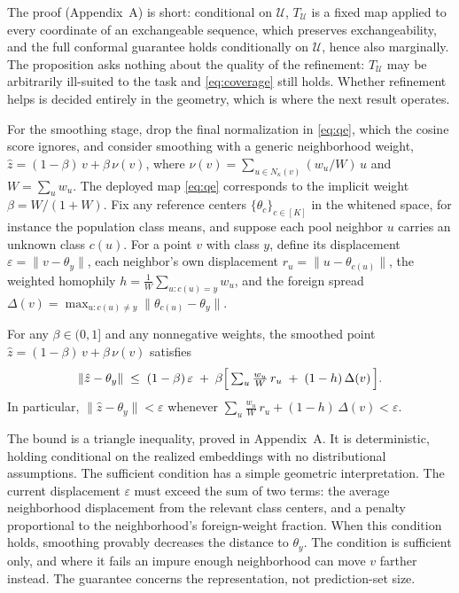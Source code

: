 The proof (Appendix~A) is short: conditional on $\mathcal{U}$,
$T_{\mathcal{U}}$ is a fixed map applied to every coordinate of an
exchangeable sequence, which preserves exchangeability, and the full
conformal guarantee holds conditionally on $\mathcal{U}$, hence also
marginally. The proposition asks nothing about the quality of the
refinement: $T_{\mathcal{U}}$ may be arbitrarily ill-suited to the
task and \eqref{eq:coverage} still holds. Whether refinement helps is
decided entirely in the geometry, which is where the next result
operates.

For the smoothing stage, drop the final normalization in
\eqref{eq:qe}, which the cosine score ignores, and consider smoothing
with a generic neighborhood weight,
$\hat z = (1-\beta)\, v + \beta\, \nu(v)$, where
$\nu(v) = \sum_{u \in N_{\kappa}(v)} (w_u / W)\, u$ and
$W = \sum_{u} w_u$. The deployed map \eqref{eq:qe} corresponds to the
implicit weight $\beta = W/(1+W)$. Fix any reference centers
$\{\theta_c\}_{c \in [K]}$ in the whitened space, for instance the
population class means, and suppose each pool neighbor $u$ carries an
unknown class $c(u)$. For a point
$v$ with class $y$, define its displacement
$\varepsilon = \lVert v - \theta_y \rVert$, each neighbor's own
displacement $r_u = \lVert u - \theta_{c(u)} \rVert$, the weighted
homophily $h = \frac{1}{W} \sum_{u : c(u) = y} w_u$, and the foreign
spread $\Delta(v) = \max_{u : c(u) \neq y} \lVert \theta_{c(u)} -
\theta_y \rVert$.

\begin{lemma}
\label{lem:smooth}
For any $\beta \in (0, 1]$ and any nonnegative weights, the smoothed
point $\hat z = (1-\beta)\, v + \beta\, \nu(v)$ satisfies
\begin{equation}
\label{eq:d1}
\lVert \hat z - \theta_y \rVert \;\le\;
(1-\beta)\, \varepsilon \;+\;
\beta \Bigl[\, \textstyle\sum_{u} \frac{w_u}{W}\, r_u
\;+\; (1 - h)\, \Delta(v) \,\Bigr] .
\end{equation}
In particular, $\lVert \hat z - \theta_y \rVert < \varepsilon$
whenever
$\sum_{u} \frac{w_u}{W}\, r_u + (1 - h)\, \Delta(v) < \varepsilon$.
\end{lemma}

The bound is a triangle inequality, proved in Appendix~A. It is
deterministic, holding conditional on the realized embeddings with no
distributional assumptions. The sufficient condition has a simple
geometric interpretation. The current displacement $\varepsilon$ must
exceed the sum of two terms: the average neighborhood displacement
from the relevant class centers, and a penalty proportional to the
neighborhood's foreign-weight fraction. When this condition holds,
smoothing provably decreases the distance to $\theta_y$. The condition
is sufficient only, and where it fails an impure enough neighborhood
can move $v$ farther instead. The guarantee concerns the
representation, not prediction-set size.

